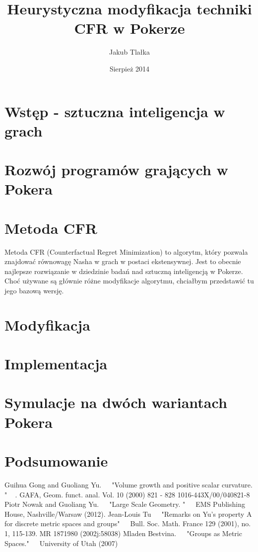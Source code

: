 \documentclass[licencjacka]{pracamgr}
\author{Jakub Tlałka}
\title{Heurystyczna modyfikacja techniki CFR w Pokerze}
\date{Sierpież 2014}
\begin{document}
\maketitle

\begin{abstract}
\end{abstract}

\tableofcontents

\chapter{Wstęp - sztuczna inteligencja w grach}

\chapter{Rozwój programów grających w Pokera}

\chapter{Metoda CFR}

Metoda CFR (Counterfactual Regret Minimization) to algorytm, który pozwala znajdować równowagę Nasha
w grach w postaci ekstensywnej. Jest to obecnie najlepsze rozwiązanie w dziedzinie badań nad
sztuczną inteligencją w Pokerze. Choć używane są głównie różne modyfikacje algorytmu, chciałbym
przedstawić tu jego bazową wersję.

\chapter{Modyfikacja}

\chapter{Implementacja}

\chapter{Symulacje na dwóch wariantach Pokera}

\chapter{Podsumowanie}


\begin{thebibliography}{99}
 Guihua Gong and Guoliang Yu. $\;\;\;$ "Volume growth and positive scalar curvature. " $\;\;\;$. GAFA, Geom. funct. anal.
Vol. 10 (2000) 821 - 828 1016-443X/00/040821-8
 Piotr Nowak and Guoliang Yu. $\;\;\;$ "Large Scale Geometry. " $\;\;\;$ EMS Publishing House, Nashville/Warsaw (2012).
 Jean-Louis Tu $\;\;\;$ "Remarks on Yu's property A for discrete metric spaces and groups" $\;\;\;$ Bull. Soc. Math. France 129 (2001), no. 1, 115-139. MR 1871980 (2002j:58038)
 Mladen Bestvina. $\;\;\;$ "Groups as Metric Spaces." $\;\;\;$ University of Utah (2007)
\end{thebibliography}
\end{document}
